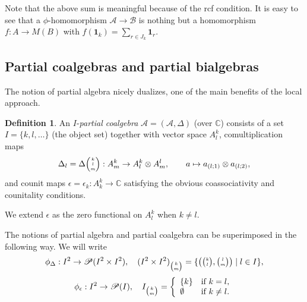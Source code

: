 \documentclass[10pt]{article}
\newcommand{\C}{\mathbb{C}}
\newcommand{\Grt}[3]{#1{\tiny {\begin{pmatrix} #2\\#3\end{pmatrix}}}}
\newcommand{\Grtt}[4]{#1{\tiny {\begin{pmatrix} #2\\#3\\#4\end{pmatrix}}}}
\newcommand{\pms}[2]{{\tiny {\begin{pmatrix} #1\\#2\end{pmatrix}}}}
\newcommand{\GrRA}[3]{#1^{#2}_{#3}} %
\newcommand{\Unit}{\mathbf{1}}
\newcommand{\bmult}{*}
\theoremstyle{definition}
\newtheorem{Def}[Theorem]{Definition}
\numberwithin{equation}{section}
\begin{document}
Note that the above sum is meaningful because of the rcf condition.  It is easy to see that a $\phi$-homomorphism $\mathscr{A}\rightarrow \mathscr{B}$ is nothing but a homomorphism $f:A\rightarrow M(B)$ with $f(\Unit_k) = \sum_{r\in J_k} \Unit_r$. 

\subsection{Partial coalgebras and partial bialgebras}

The notion of partial algebra nicely dualizes, one of the main benefits of the local approach. 

\begin{Def}\label{DefCoAlg} An  $I$-\emph{partial coalgebra} $\mathscr{A}=(\mathscr{A},\Delta)$ (over $\C$) consists of a set $I=\{k,l,\ldots\}$ (the object set) together with vector space $\GrRA{A}{k}{l}$, comultiplication maps \[\Delta_{l} = \Grtt{\Delta}{k}{l}{m}:\GrRA{A}{k}{m}\rightarrow \GrRA{A}{k}{l}\otimes \GrRA{A}{l}{m},\qquad a \mapsto a_{(l;1)}\otimes a_{(l;2)},\] and counit maps $\epsilon =\epsilon_k:\GrRA{A}{k}{k}\rightarrow \C$ satisfying the obvious coassociativity and counitality conditions.
\end{Def}

We extend $\epsilon$ as the zero functional on $\GrRA{A}{k}{l}$ when $k\neq l$.

The notions of partial algebra and partial coalgebra can be superimposed in the following way.  We will write 
\[\phi_{\Delta}: I^2 \rightarrow \mathscr{P}(I^2\times I^2),\quad (I^2\times I^2)_{{\tiny \begin{pmatrix} k\\m \end{pmatrix}}} = \{\left(\pms{k}{l},\pms{l}{m}\right)\mid l\in I\},\] \[\phi_{\epsilon}: I^2 \rightarrow \mathscr{P}(I),\quad I_{{\tiny \begin{pmatrix} k\\m \end{pmatrix}}} = \left\{\begin{array}{lll} \{k\}& \textrm{if } k= l,\\ \emptyset & \textrm{if } k\neq l. \end{array}\right.\]
\end{document}
